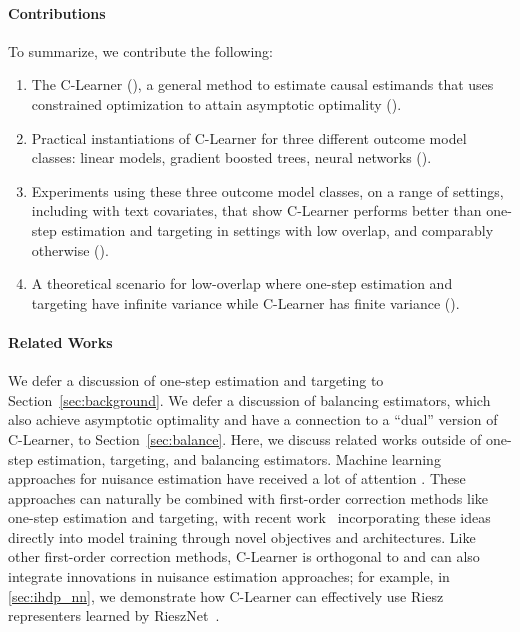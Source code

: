 \paragraph{Contributions}
To summarize, we contribute the following: 
\begin{enumerate}
    \item The C-Learner (), a general method to estimate causal estimands that uses constrained optimization to attain asymptotic optimality (). 
    \item Practical instantiations of C-Learner for three different outcome model classes: linear models, gradient boosted trees, neural networks (). 
    \item Experiments using these three outcome model classes, on a range of settings, including with text covariates, that show C-Learner performs better than one-step estimation and targeting in settings with low overlap, and comparably otherwise ().
    \item A theoretical scenario for low-overlap where one-step estimation and targeting have infinite variance while C-Learner has finite variance (). %
\end{enumerate}



\paragraph{Related Works} We defer a discussion of one-step estimation and targeting to Section~\ref{sec:background}. We defer a discussion of balancing estimators, which also achieve asymptotic optimality and have a connection to a ``dual'' version of C-Learner, to Section~\ref{sec:balance}.
Here, we discuss related works outside of one-step estimation, targeting, and balancing estimators. 
Machine learning approaches for nuisance estimation have received a lot of attention \citep{athey2016recursive,athey2018approximate,athey2019generalized,oprescu2019orthogonal,hahn2019bayesian,wager2018estimation}. %
These approaches can naturally be combined with first-order correction methods like one-step estimation %
and targeting, %
with recent work~\citep{shi2019adapting,chernozhukov2022riesznet} incorporating these ideas directly into model training through novel objectives and architectures. 
Like other first-order correction methods, C-Learner is orthogonal to and can also integrate innovations in nuisance estimation approaches; for example, in \cref{sec:ihdp_nn}, 
we demonstrate how C-Learner can effectively use Riesz representers learned by RieszNet~\citep{chernozhukov2022riesznet}. 


